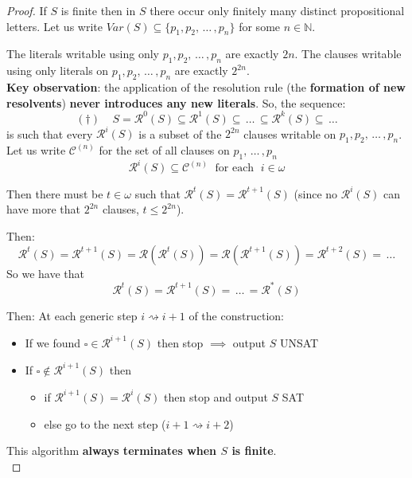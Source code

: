 \begin{proof}
	If $S$ is finite then in $S$ there occur only finitely many distinct propositional letters. Let us write $Var (S) \subseteq \{p_1, p_2, \, \dots \, , p_n\}$ for some $n \in \mathbb{N}$.

	The literals writable using only $p_1, p_2, \, \dots \, , p_n$ are exactly $2n$. The clauses writable using only literals on $p_1, p_2, \, \dots \, , p_n$ are exactly $2^{2n}$.\\

	\textbf{Key observation}: the application of the resolution rule (the \textbf{formation of new resolvents}) \textbf{never introduces any new literals}. So, the sequence:
	$$(\dag) \;\;\;\; S = \mathcal{R}^0 (S) \subseteq \mathcal{R}^1 (S) \subseteq  \, \dots \, \subseteq \mathcal{R}^k (S) \subseteq \, \dots $$
	is such that every $\mathcal{R}^i (S)$ is a subset of the $2^{2n}$ clauses writable on $p_1, p_2, \, \dots \, , p_n$.
	Let us write $\mathcal{C}^{(n)}$ for the set of all clauses on $p_1, \, \dots \, , p_n$
	$$ \mathcal{R}^i (S)  \subseteq \mathcal{C}^{(n)} \; \text{ for each } \; i \in \omega $$

	Then there must be $t \in \omega$ such that $\mathcal{R}^t (S) = \mathcal{R}^{t+1} (S)$ (since no $\mathcal{R}^i (S)$ can have more that $2^{2n}$ clauses, $t \leq 2^{2n}$).

    \noindent
	Then:
	$$ \mathcal{R}^t (S) = \mathcal{R}^{t+1} (S) = \mathcal{R} \left(\mathcal{R}^t(S)\right) = \mathcal{R} \left(\mathcal{R}^{t+1} (S)\right) = \mathcal{R}^{t+2} (S) = \, \dots $$
	So we have that
	$$ \mathcal{R}^t (S) = \mathcal{R}^{t+1} (S)  = \, \dots \, = \mathcal{R}^\ast (S) $$

    \noindent
	Then: At each generic step $i \rightsquigarrow i+1$ of the construction:
	\begin{itemize}
		\item If we found $\square \in \mathcal{R}^{i+1} (S)$ then stop $\implies$ output $S$ UNSAT
		\item If $\square \notin \mathcal{R}^{i+1} (S)$ then
		\begin{itemize}
			\item if $\mathcal{R}^{i+1} (S) = \mathcal{R}^i (S)$ then stop and output $S$ SAT
			\item else go to the next step ($i+1 \rightsquigarrow i+2$)
		\end{itemize}
	\end{itemize}

    \noindent
	This algorithm \textbf{always terminates when $S$ is finite}.\\
\end{proof}


